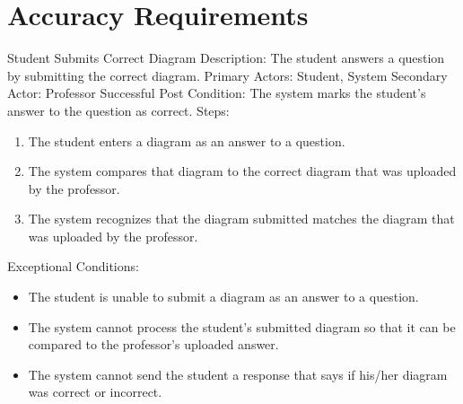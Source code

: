 
\chapter{Accuracy Requirements}

    \begin{section}{Student Submits Correct Diagram}
        Description: The student answers a question by submitting the correct diagram. \newline
        Primary Actors: Student, System \newline
        Secondary Actor: Professor \newline
        Successful Post Condition: The system marks the student's answer to the question as correct. \newline
        Steps:
        \begin{enumerate}
            \item{The student enters a diagram as an answer to a question.}
            \item{The system compares that diagram to the correct diagram that was uploaded by the professor.}
            \item{The system recognizes that the diagram submitted matches the diagram that was uploaded by the professor.}
        \end{enumerate}
        Exceptional Conditions:
        \begin{itemize}
            \item{The student is unable to submit a diagram as an answer to a question.}
            \item{The system cannot process the student's submitted diagram so that it can be compared to the professor's uploaded answer.}
            \item{The system cannot send the student a response that says if his/her diagram was correct or incorrect.}
        \end{itemize}
    \end{section}

